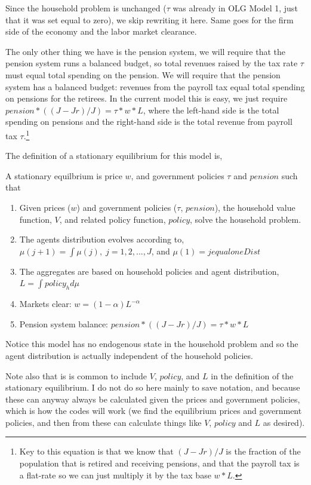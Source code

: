 Since the household problem is unchanged ($\tau$ was already in OLG Model 1, just that it was set equal to zero), we skip rewriting it here. Same goes for the firm side of the economy and the labor market clearance.

The only other thing we have is the pension system, we will require that the pension system runs a balanced budget, so total revenues raised by the tax rate $\tau$ must equal total spending on the pension. We will require that the pension system has a balanced budget: revenues from the payroll tax equal total spending on pensions for the retirees. In the current model this is easy, we just require $pension*((J-Jr)/J)=\tau*w*L$, where the left-hand side is the total spending on pensions and the right-hand side is the total revenue from payroll tax $\tau$.\footnote{Key to this equation is that we know that $(J-Jr)/J$ is the fraction of the population that is retired and receiving pensions, and that the payroll tax is a flat-rate so we can just multiply it by the tax base $w*L$.}

The definition of a stationary equilibrium for this model is,
\begin{definition}
 A stationary equilbrium is price $w$, and government policies $\tau$ and $pension$ such that
 \begin{enumerate}
  \item Given prices ($w$) and government policies ($\tau$, $pension$), the household value function, $V$, and related policy function, $policy$, solve the household problem.
  \item The agents distribution evolves according to,
   \\  $\mu(j+1)=\int \mu(j), \; j=1,2,...,J$, and $\mu(1)=jequaloneDist$
  \item The aggregates are based on household policies and agent distribution,
   \\  $L=\int policy_h d\mu$
  \item Markets clear: $w=(1-\alpha)L^{-\alpha}$
  \item Pension system balance: $pension*((J-Jr)/J)=\tau*w*L$
 \end{enumerate}
\end{definition}
Notice this model has no endogenous state in the household problem and so the agent distribution is actually independent of the household policies.

Note also that is is common to include $V$, $policy$, and $L$ in the definition of the stationary equilibrium. I do not do so here mainly to save notation, and because these can anyway always be calculated given the prices and government policies, which is how the codes will work (we find the equilibrium prices and government policies, and then from these can calculate things like $V$, $policy$ and $L$ as desired).

